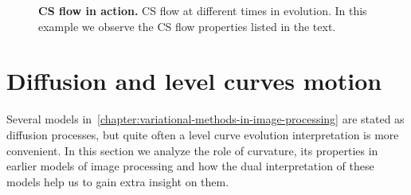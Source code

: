 \begin{figure}
\hspace{1em}
\caption{\textbf{CS flow in action.} CS flow at different times in evolution. In this example we observe the CS flow properties listed in the text.}
\end{figure}



\section{Diffusion and level curves motion}
\label{ch3:sec:diffusion-level-curves-motion}

Several models in~\cref{chapter:variational-methods-in-image-processing} are stated as diffusion processes, but quite often a level curve evolution interpretation is more convenient. In this section we analyze the role of curvature, its properties in earlier models of image processing and how the dual interpretation of these models help us to gain extra insight on them.

